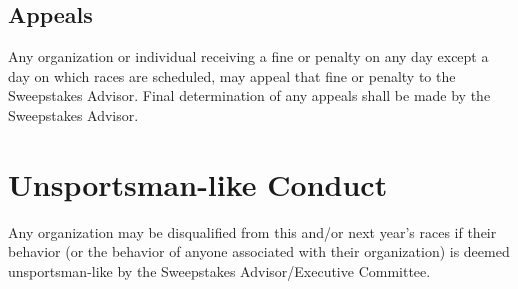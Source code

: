 \subsection{Appeals}

	Any organization or individual receiving a fine or penalty on any day except a
	day on which races are scheduled, may appeal that fine or penalty to the
	Sweepstakes Advisor. Final determination of any appeals shall be made by the
	Sweepstakes Advisor.

\section{Unsportsman-like Conduct}

	Any organization may be disqualified from this and/or next year's races if
	their behavior (or the behavior of anyone associated with their organization)
	is deemed unsportsman-like by the Sweepstakes Advisor/Executive Committee.


